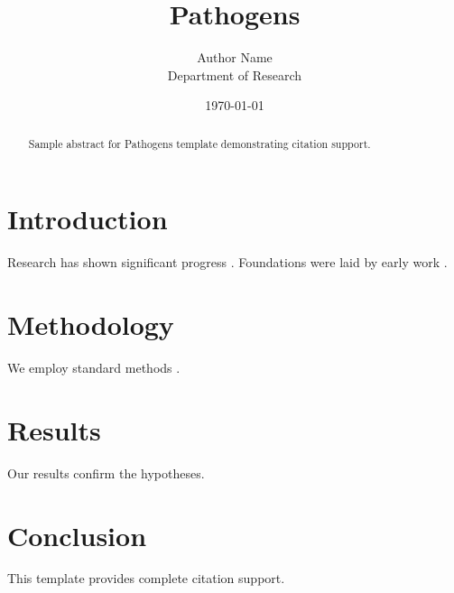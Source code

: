 \documentclass{mdpi}
\title{Pathogens}
\author{Author Name \\ \small Department of Research}
\date{\today}
\begin{document}
\maketitle

\begin{abstract}
Sample abstract for Pathogens template demonstrating citation support.
\end{abstract}

\section{Introduction}
Research has shown significant progress \citep{einstein1905}. Foundations were laid by early work \citep{turing1950}.

\section{Methodology}
We employ standard methods \citep{knuth1984}.

\section{Results}
Our results confirm the hypotheses.

\section{Conclusion}
This template provides complete citation support.



\end{document}
